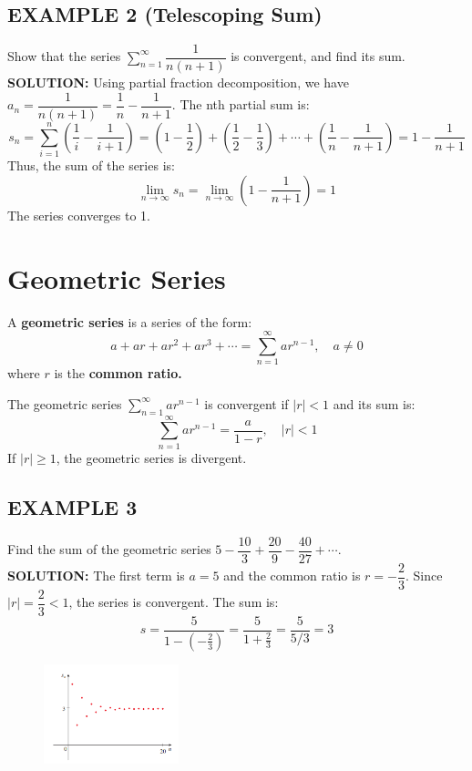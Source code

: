 \documentclass{article}
\begin{document}
\subsection*{EXAMPLE 2 (Telescoping Sum)}
Show that the series \( \sum_{n=1}^{\infty} \dfrac{1}{n(n+1)} \) is convergent, and find its sum.\\
\textbf{SOLUTION:}
Using partial fraction decomposition, we have \( a_n = \dfrac{1}{n(n+1)} = \dfrac{1}{n} - \dfrac{1}{n+1} \).
The nth partial sum is:
\[ s_n = \sum_{i=1}^{n} \left(\dfrac{1}{i} - \dfrac{1}{i+1}\right) = \left(1 - \dfrac{1}{2}\right) + \left(\dfrac{1}{2} - \dfrac{1}{3}\right) + \cdots + \left(\dfrac{1}{n} - \dfrac{1}{n+1}\right) = 1 - \dfrac{1}{n+1} \]
Thus, the sum of the series is:
\[ \lim_{n\to\infty} s_n = \lim_{n\to\infty} \left(1 - \dfrac{1}{n+1}\right) = 1 \]
The series converges to 1.

\section*{Geometric Series}
A \textbf{geometric series} is a series of the form:
\[ a + ar + ar^2 + ar^3 + \cdots = \sum_{n=1}^{\infty} ar^{n-1}, \quad a \neq 0 \]
where \(r\) is the \textbf{common ratio.}

\begin{tcolorbox}[
    colback=white,
    colframe=orange!80!white,
    title=Sum of a Geometric Series,
    boxrule=0.5mm,
    arc=3mm
    ]
    The geometric series \( \sum_{n=1}^{\infty} ar^{n-1} \) is convergent if \(|r|<1\) and its sum is:
    \[ \sum_{n=1}^{\infty} ar^{n-1} = \dfrac{a}{1 - r}, \quad |r| < 1 \]
    If \(|r| \ge 1\), the geometric series is divergent.
\end{tcolorbox}

\subsection*{EXAMPLE 3}
Find the sum of the geometric series \( 5 - \dfrac{10}{3} + \dfrac{20}{9} - \dfrac{40}{27} + \cdots \).\\
\textbf{SOLUTION:}
The first term is \(a = 5\) and the common ratio is \(r = -\dfrac{2}{3}\). Since \(|r| = \dfrac{2}{3} < 1\), the series is convergent. The sum is:
\[ s = \dfrac{5}{1 - (-\frac{2}{3})} = \dfrac{5}{1 + \frac{2}{3}} = \dfrac{5}{5/3} = 3 \]
\begin{figure}[htbp]
    \centering
    \includegraphics[width=0.35\textwidth]{graph72.png}
  \end{figure}
\end{document}
